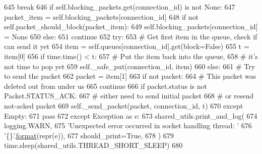 \begin{DoxyCode}
645                         \textcolor{keywordflow}{break}
646                     \textcolor{keywordflow}{if} self.blocking\_packets.get(connection\_id) \textcolor{keywordflow}{is} \textcolor{keywordflow}{not} \textcolor{keywordtype}{None}:
647                         packet\_item = self.blocking\_packets[connection\_id]
648                         \textcolor{keywordflow}{if} \textcolor{keywordflow}{not} self.packet\_should\_block(packet\_item):
649                             self.blocking\_packets[connection\_id] = \textcolor{keywordtype}{None}
650                         \textcolor{keywordflow}{else}:
651                             \textcolor{keywordflow}{continue}
652                     \textcolor{keywordflow}{try}:
653                         \textcolor{comment}{# Get first item in the queue, check if can send it yet}
654                         item = self.queues[connection\_id].get(block=\textcolor{keyword}{False})
655                         t = item[0]
656                         \textcolor{keywordflow}{if} time.time() < t:
657                             \textcolor{comment}{# Put the item back into the queue,}
658                             \textcolor{comment}{# it's not time to pop yet}
659                             self.\_safe\_put(connection\_id, item)
660                         \textcolor{keywordflow}{else}:
661                             \textcolor{comment}{# Try to send the packet}
662                             packet = item[1]
663                             \textcolor{keywordflow}{if} \textcolor{keywordflow}{not} packet:
664                                 \textcolor{comment}{# This packet was deleted out from under us}
665                                 \textcolor{keywordflow}{continue}
666                             \textcolor{keywordflow}{if} packet.status \textcolor{keywordflow}{is} \textcolor{keywordflow}{not} Packet.STATUS\_ACK:
667                                 \textcolor{comment}{# either need to send initial packet}
668                                 \textcolor{comment}{# or resend not-acked packet}
669                                 self.\_send\_packet(packet, connection\_id, t)
670                     \textcolor{keywordflow}{except} Empty:
671                         \textcolor{keywordflow}{pass}
672                 \textcolor{keywordflow}{except} Exception \textcolor{keyword}{as} e:
673                     shared\_utils.print\_and\_log(
674                         logging.WARN,
675                         \textcolor{stringliteral}{'Unexpected error occurred in socket handling thread: '}
676                         \textcolor{stringliteral}{'\{\}'}.\hyperlink{namespaceparlai_1_1chat__service_1_1services_1_1messenger_1_1shared__utils_a32e2e2022b824fbaf80c747160b52a76}{format}(repr(e)),
677                         should\_print=\textcolor{keyword}{True},
678                     )
679             time.sleep(shared\_utils.THREAD\_SHORT\_SLEEP)
680 
\end{DoxyCode}
